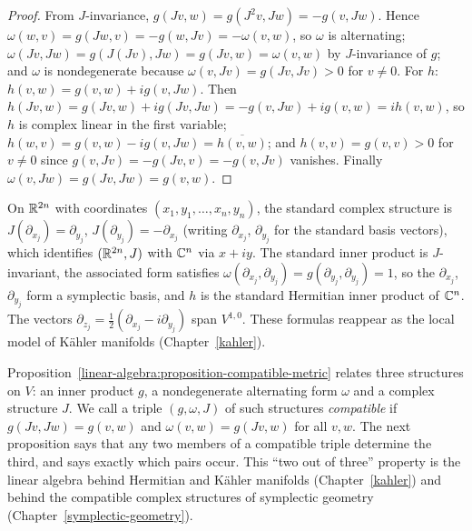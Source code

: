 \begin{proof}
From $J$-invariance, $g(Jv, w) = g(J^2 v, Jw) = -g(v, Jw)$. Hence
$\omega(w, v) = g(Jw, v) = -g(w, Jv) = -\omega(v, w)$, so $\omega$ is alternating;
$\omega(Jv, Jw) = g(J(Jv), Jw) = g(Jv, w) = \omega(v, w)$ by $J$-invariance of $g$; and $\omega$ is
nondegenerate because $\omega(v, Jv) = g(Jv, Jv) > 0$ for $v \neq 0$. For $h$:
$h(v, w) = g(v, w) + i g(v, Jw)$. Then $h(Jv, w) = g(Jv, w) + ig(Jv, Jw) = -g(v, Jw) + ig(v, w) = ih(v, w)$, so $h$ is
complex linear in the first variable; $h(w, v) = g(v, w) - ig(v, Jw) = \overline{h(v, w)}$; and
$h(v, v) = g(v, v) > 0$ for $v \neq 0$ since $g(v, Jv) = -g(Jv, v) = -g(v, Jv)$ vanishes. Finally
$\omega(v, Jw) = g(Jv, Jw) = g(v, w)$.
\end{proof}

\begin{example}\label{linear-algebra:example-standard-structure}
On $\mathbb{R}^{2n}$ with coordinates $(x_1, y_1, \ldots, x_n, y_n)$, the standard complex structure is
$J(\partial_{x_j}) = \partial_{y_j}$, $J(\partial_{y_j}) = -\partial_{x_j}$ (writing $\partial_{x_j}$, $\partial_{y_j}$ for the standard basis vectors),
which identifies $(\mathbb{R}^{2n}, J)$ with $\mathbb{C}^n$ via $x + iy$. The standard inner product is $J$-invariant, the
associated form satisfies $\omega(\partial_{x_j}, \partial_{y_j}) = g(\partial_{y_j}, \partial_{y_j}) = 1$, so the $\partial_{x_j}$, $\partial_{y_j}$
form a symplectic basis, and $h$ is the standard Hermitian inner product of $\mathbb{C}^n$. The vectors
$\partial_{z_j} = \frac12(\partial_{x_j} - i\partial_{y_j})$ span $V^{1,0}$. These formulas reappear as the local model of Kähler
manifolds (Chapter~\ref{kahler}).
\end{example}

Proposition~\ref{linear-algebra:proposition-compatible-metric} relates three structures on $V$: an inner product $g$, a nondegenerate alternating form $\omega$ and a complex structure $J$. We call a triple
$(g, \omega, J)$ of such structures \emph{compatible} if $g(Jv, Jw) = g(v, w)$ and $\omega(v, w) = g(Jv, w)$ for all $v, w$. The next proposition says that any two members of a compatible triple
determine the third, and says exactly which pairs occur. This ``two out of three'' property is the linear algebra behind Hermitian and K\"ahler manifolds (Chapter~\ref{kahler}) and behind the
compatible complex structures of symplectic geometry (Chapter~\ref{symplectic-geometry}).

